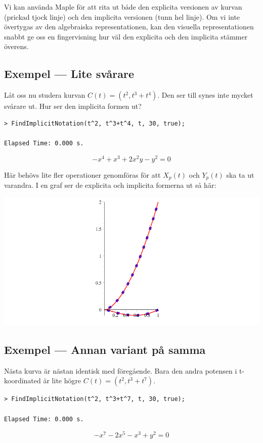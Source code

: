 Vi kan använda Maple för att rita ut både den explicita versionen av kurvan (prickad tjock linje) och den implicita versionen (tunn hel linje). Om vi inte övertygas av den algebraiska representationen, kan den visuella representationen snabbt ge oss en fingervisning hur väl den explicita och den implicita stämmer överens.

\subsection{Exempel --- Lite svårare}
\label{ImplicitNotationEx2}

Låt oss nu studera kurvan $C(t)=(t^2,t^3+t^4)$. Den ser till synes inte mycket svårare ut. Hur ser den implicita formen ut?

\begin{verbatim}
> FindImplicitNotation(t^2, t^3+t^4, t, 30, true);

Elapsed Time: 0.000 s.
\end{verbatim}
\[-x^4+x^3+2x^2y-y^2 = 0\]

Här behövs lite fler operationer genomföras för att $X_p(t)$ och $Y_p(t)$ ska ta ut varandra. I en graf ser de explicita och implicita formerna ut så här:

\begin{center}
\includegraphics[scale=0.35]{Export/implicitplot2.png}
\end{center}

\subsection{Exempel --- Annan variant på samma}
\label{ImplicitNotationEx3}

Nästa kurva är nästan identisk med föregående. Bara den andra potensen i t-koordinated är lite högre $C(t)=(t^2,t^3+t^7)$.

\begin{verbatim}
> FindImplicitNotation(t^2, t^3+t^7, t, 30, true);

Elapsed Time: 0.000 s.
\end{verbatim}
\[-x^7-2x^5-x^3+y^2 = 0\]

